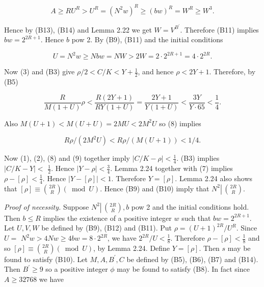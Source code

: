 \documentclass[11pt,a4paper]{article}
\newcommand{\origpage}[1]{\marginnote{\footnotesize\textbf{[#1]}}}
\begin{document}
\begin{equation*}
A \geq R U^{R}>U^{R}=\left(N^{2} w\right)^{R} \geq(bw)^{R}=W^{R} \geq W^{3} . \tag{6}
\end{equation*}


\origpage{558}Hence by (B13), (B14) and Lemma 2.22 we get $W=V^{B^{\prime}}$. Therefore (B11) implies $b w=2^{2 R+1}$. Hence $b$ pow 2. By (B9), (B11) and the initial conditions


\begin{equation*}
U=N^{2} w \geq N b w=N W>2 W=2 \cdot 2^{2 R+1}=4 \cdot 2^{2 R} . \tag{7}
\end{equation*}


Now (3) and (B3) give $\rho/2<C/K<Y+\frac12$, and hence $\rho<2Y+1$. Therefore, by (B5)


\begin{equation*}
\frac{R}{M(1+U)} \rho<\frac{R(2 Y+1)}{R Y(1+U)}=\frac{2 Y+1}{Y(1+U)}<\frac{3 Y}{Y \cdot 65}<\frac{1}{4} . \tag{8}
\end{equation*}


Also $M(U+1)<M(U+U)=2 M U<2 M^{2} U$ so (8) implies


\begin{equation*}
R \rho /\left(2 M^{2} U\right)<R \rho /(M(U+1))<1 / 4 . \tag{9}
\end{equation*}


Now (1), (2), (8) and (9) together imply $|C / K-\rho|<\frac{1}{4}$. (B3) implies $|C / K-Y|<$ $\frac{1}{2}$. Hence $|Y-\rho|<\frac{3}{4}$. Lemma 2.24 together with (7) implies $\rho-[\rho]<\frac{1}{4}$. Hence $|Y-[\rho]|<1$. Therefore $Y=[\rho]$. Lemma 2.24 also shows that $[\rho] \equiv\binom{2 R}{R}(\bmod U)$. Hence (B9) and (B10) imply that $N^{2} \left\lvert\,\allowbreak \binom{ 2 R}{R}\right.$.

\noindent\emph{Proof of necessity.} Suppose $N^{2} \left\lvert\,\allowbreak \binom{ 2 R}{R}\right.,\allowbreak  b$ pow 2 and the initial conditions hold. Then $b \leq R$ implies the existence of a positive integer $w$ such that $b w=2^{2 R+1}$. Let $U,\allowbreak  V,\allowbreak  W$ be defined by (B9), (B12) and (B11). Put $\rho=(U+1)^{2 R} / U^{R}$. Since $U=$ $N^{2}w>4Nw\geq4bw=8 \cdot 2^{2 R}$, we have $2^{2 R} / U<\frac{1}{8}$. Therefore $\rho-[\rho]<\frac{1}{8}$ and so $[\rho] \equiv\binom{2 R}{R}(\bmod U)$, by Lemma 2.24. Define $Y=[\rho]$. Then $s$ may be found to satisfy (B10). Let $M,\allowbreak  A,\allowbreak  B^{\prime},\allowbreak  C$ be defined by (B5), (B6), (B7) and (B14). Then $B^{\prime} \geq 9$ so a positive integer $\phi$ may be found to satisfy (B8). In fact since $A \geq 32768$ we have
\end{document}

